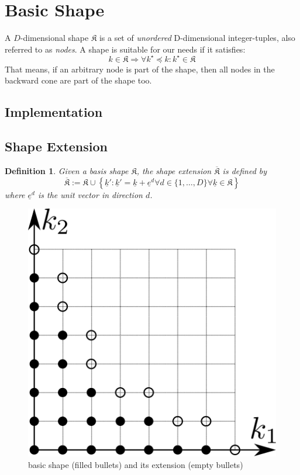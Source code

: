 \documentclass{article}
\newtheorem{definition}{Definition}
\begin{document}
\tableofcontents
\clearpage

\section{Basic Shape}

A \(D\)-dimensional
shape \(\mathfrak{K}\)
is a set of \emph{unordered} D-dimensional integer-tuples, also
referred to as \emph{nodes}.  A shape is suitable for our needs if it
satisfies:
\[k \in \mathfrak{K} \Rightarrow \forall k^\star \preceq k \colon
  k^\star \in \mathfrak{K}\]
That means, if an arbitrary node is part of the shape, then all nodes
in the backward cone are part of the shape too.

\subsection{Implementation}

\subsection{Shape Extension}

\begin{definition}
  Given a basis shape \( \mathfrak{K} \),
  the shape extension \( \overline{\mathfrak{K}} \) is defined by
  \begin{equation}
    \overline{\mathfrak{K}} := \mathfrak{K} \cup 
    \left\{\underline{k}' \colon \underline{k}' = \underline{k} + \underline{e}^d 
      \forall d \in \{1,\ldots,D\} \forall \underline{k} \in \mathfrak{K}\right\}
  \end{equation}
  where \( \underline{e}^d \) is the unit vector in direction \( d \).
\end{definition}

\begin{figure}[H]
  \begin{center}
    \includegraphics[width=0.5\linewidth]{shape_extension}
  \end{center}
  \caption{basic shape (filled bullets) and its extension (empty
    bullets)}
\end{figure}
\end{document}
